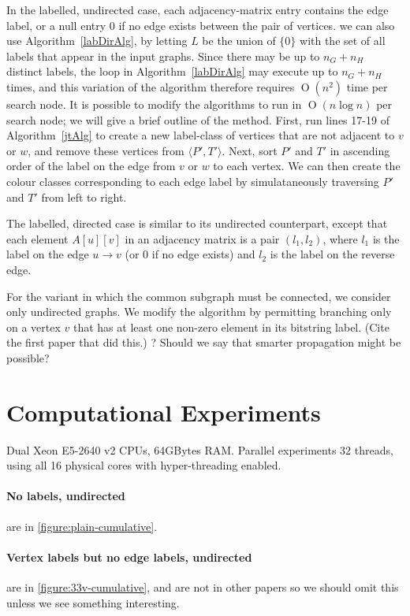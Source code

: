 \documentclass[letterpaper]{article}
\newcommand{\BigO}[1]{\ensuremath{\operatorname{O}\left(#1\right)}}
\begin{document}
In the labelled, undirected case, each adjacency-matrix entry contains the edge
label, or a null entry 0 if no edge exists between the pair of vertices.  we
can also use Algorithm~\ref{labDirAlg}, by letting $L$ be the union of $\{0\}$
with the set of all labels that appear in the input graphs. Since there may be
up to $n_G + n_H$ distinct labels, the loop in Algorithm~\ref{labDirAlg} may
execute up to $n_G + n_H$ times, and this variation of the algorithm therefore
requires $\BigO{n^2}$ time per search node.  It is possible to modify the
algorithms to run in $\BigO{n \log n}$ per search node; we will give a brief
outline of the method. First, run lines 17-19 of Algorithm~\ref{jtAlg} to
create a new label-class of vertices that are not adjacent to $v$ or $w$, and
remove these vertices from $\langle P',T' \rangle$. Next, sort $P'$ and $T'$ in
ascending order of the label on the edge from $v$ or $w$ to each vertex. We can
then create the colour classes corresponding to each edge label by
simulataneously traversing $P'$ and $T'$ from left to right.

The labelled, directed case is similar to its undirected counterpart, except that
each element $A[u][v]$ in an adjacency matrix is a pair $(l_1, l_2)$, where
$l_1$ is the label on the edge $u \rightarrow v$ (or 0 if no edge exists) and $l_2$
is the label on the reverse edge.

For the variant in which the common subgraph must be connected, we consider
only undirected graphs. We modify the algorithm by permitting branching only on
a vertex $v$ that has at least one non-zero element in its bitstring label.
(Cite the first paper that did this.) ? Should we say that smarter propagation
might be possible?

\section{Computational Experiments}

Dual Xeon E5-2640 v2 CPUs, 64GBytes RAM. Parallel experiments 32 threads, using
all 16 physical cores with hyper-threading enabled.

\paragraph{No labels, undirected} are in \cref{figure:plain-cumulative}.

\paragraph{Vertex labels but no edge labels, undirected} are in \cref{figure:33v-cumulative}, and are not in other papers so we should omit this unless we see something interesting.
\end{document}
